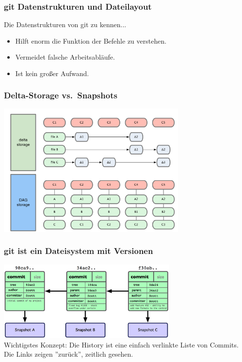 \begin{frame}
  \frametitle{git Datenstrukturen und Dateilayout}
  \begin{block}{Die Datenstrukturen von git zu kennen...}
    \begin{itemize}
      \item Hilft enorm die Funktion der Befehle zu verstehen.
      \item Vermeidet falsche Arbeitsabläufe.
      \item Ist kein großer Aufwand.
    \end{itemize}
  \end{block}
\end{frame}

\begin{frame}
  \frametitle{Delta-Storage vs.\ Snapshots}
  \begin{center}
    \includegraphics[width=9.5cm]{img/delta_storage.pdf}
  \end{center}
\end{frame}

\begin{frame}
  \frametitle{git ist ein Dateisystem mit Versionen}
  \begin{center}
    \includegraphics[width=9cm]{img/history_detailed.png} \\
    Wichtigstes Konzept: Die History ist eine einfach verlinkte Liste von Commits. Die Links zeigen ''zurück'', zeitlich gesehen.
  \end{center}
\end{frame}

